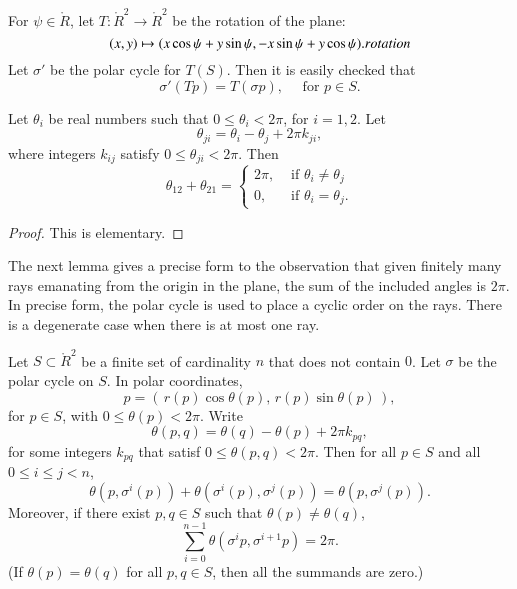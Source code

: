 For $\psi\in\ring{R}$, let $T:\ring{R}^2\to\ring{R}^2$ be the
rotation of the plane:
   \begin{equation}
   \label{eqn:rotate}
   (x,y) \mapsto  (x\cos\psi + y\sin\psi,-x\sin\psi+y\cos\psi).
   \indy{Index}{rotation}%
   \end{equation}
Let $\sigma'$ be the polar cycle for $T(S)$.  Then it is easily
checked that
$$
   \sigma'(T p) = T (\sigma p),\quad \text{ for } p\in S. 
$$
%
%

\begin{lemma}\label{lemma:polar2}
Let $\theta_i$ be real numbers such that $0\le \theta_i < 2\pi$, for $i=1,2$.
Let $$\theta_{ji} = \theta_i - \theta_j + 2\pi k_{ji},$$
where integers $k_{ij}$ satisfy $0\le \theta_{ji}< 2\pi$.
Then 
$$
  \theta_{12} + \theta_{21} = \begin{cases}
    2\pi, & \text{ if }\theta_i\ne\theta_j\\
    0,    & \text{ if }\theta_i=\theta_j.
    \end{cases}
$$
\end{lemma}
%

\begin{proof} This is elementary.
\end{proof}

The next lemma gives a precise form to the observation
that given finitely many rays emanating from the origin
in the plane, the sum of the included angles is $2\pi$.
In precise form, the polar cycle is used to place
a cyclic order on the rays.  There is a degenerate case
when there is at most one ray.


\begin{lemma}\label{lemma:polar-sum}
Let $S\subset\ring{R}^2$ be a finite set
of cardinality $n$ that does not contain $0$.
Let $\sigma$ be the polar cycle on $S$.  
In polar coordinates,
$$p=\left(\, r(p)\cos\theta(p),\, r(p)\sin\theta(p)\,\right),$$ 
for $p\in S$, with
$0\le\theta(p)<2\pi$.
Write
   $$
   \theta(p,q) = \theta(q) - \theta(p) + 2\pi k_{pq},
   $$
for some integers $k_{pq}$ that satisf $0\le \theta(p,q) < 2\pi$.
Then for all $p\in S$
and all $0\le i \le j < n$,
   $$
   \theta(p,\sigma^i(p)) +\theta(\sigma^i(p),\sigma^j(p)) =
   \theta(p,\sigma^j(p)).
   $$
Moreover, if there exist $p,q\in S$ such that $\theta(p)\ne\theta(q)$,
  $$
  \sum_{i=0}^{n-1} \theta(\sigma^{i}p,\sigma^{i+1} p) = 2\pi.
  $$
(If $\theta(p)=\theta(q)$ for all $p,q\in S$, then all the
summands are zero.)
\end{lemma}
%

